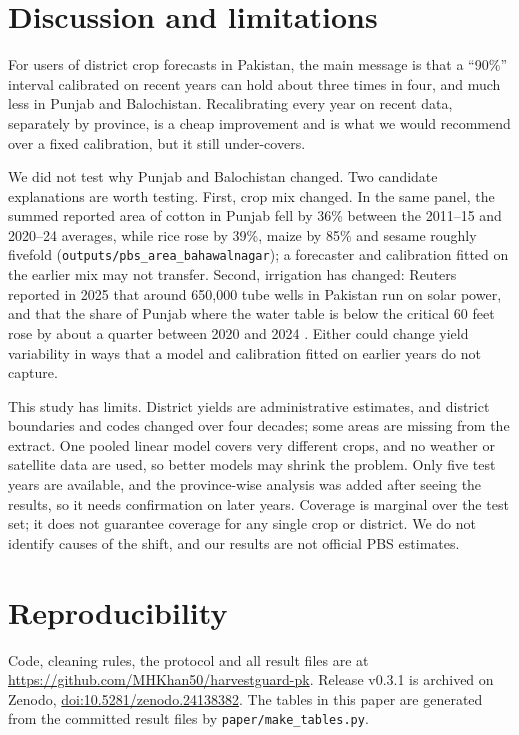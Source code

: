 \documentclass[11pt]{article}
\begin{document}
\begin{table}[!htbp]
\centering
\small
\caption{Coverage (mean width) by province. Islamabad has fewer than 50 calibration residuals and uses the pooled radius.}
\label{tab:prov}
\resizebox{\textwidth}{!}{}
\end{table}

\section{Discussion and limitations}
For users of district crop forecasts in Pakistan, the main message is that a ``90\%'' interval calibrated on recent years can hold about three times in four, and much less in Punjab and Balochistan. Recalibrating every year on recent data, separately by province, is a cheap improvement and is what we would recommend over a fixed calibration, but it still under-covers.

We did not test why Punjab and Balochistan changed. Two candidate explanations are worth testing. First, crop mix changed. In the same panel, the summed reported area of cotton in Punjab fell by 36\% between the 2011--15 and 2020--24 averages, while rice rose by 39\%, maize by 85\% and sesame roughly fivefold (\texttt{outputs/pbs\_area\_bahawalnagar}); a forecaster and calibration fitted on the earlier mix may not transfer. Second, irrigation has changed: Reuters reported in 2025 that around 650,000 tube wells in Pakistan run on solar power, and that the share of Punjab where the water table is below the critical 60 feet rose by about a quarter between 2020 and 2024 \citep{reuters2025}. Either could change yield variability in ways that a model and calibration fitted on earlier years do not capture.

This study has limits. District yields are administrative estimates, and district boundaries and codes changed over four decades; some areas are missing from the extract. One pooled linear model covers very different crops, and no weather or satellite data are used, so better models may shrink the problem. Only five test years are available, and the province-wise analysis was added after seeing the results, so it needs confirmation on later years. Coverage is marginal over the test set; it does not guarantee coverage for any single crop or district. We do not identify causes of the shift, and our results are not official PBS estimates.

\section{Reproducibility}
Code, cleaning rules, the protocol and all result files are at \url{https://github.com/MHKhan50/harvestguard-pk}. Release v0.3.1 is archived on Zenodo, \href{https://doi.org/10.5281/zenodo.24138382}{doi:10.5281/zenodo.24138382}. The tables in this paper are generated from the committed result files by \texttt{paper/make\_tables.py}.



\end{document}
